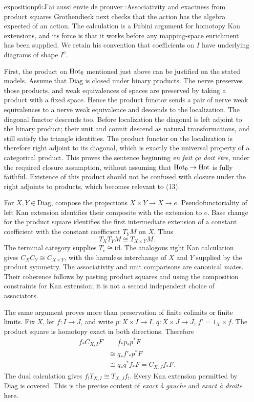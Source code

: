 \begin{dcomment}{exposition}{p6:J’ai aussi envie de prouver :}{Associativity and exactness from product squares}
Grothendieck next checks that the action has the algebra expected of an action. The calculation is a Fubini argument for homotopy Kan extensions, and its force is that it works before any mapping-space enrichment has been supplied. We retain his convention that coefficients on \(I\) have underlying diagrams of shape \(I^o\).

First, the product on \(\mathrm{Hot}_0\) mentioned just above can be justified on the stated models. Assume that \(\mathrm{Diag}\) is closed under binary products. The nerve preserves those products, and weak equivalences of spaces are preserved by taking a product with a fixed space. Hence the product functor sends a pair of nerve weak equivalences to a nerve weak equivalence and descends to the localization. The diagonal functor descends too. Before localization the diagonal is left adjoint to the binary product; their unit and counit descend as natural transformations, and still satisfy the triangle identities. The product functor on the localization is therefore right adjoint to its diagonal, which is exactly the universal property of a categorical product. This proves the sentence beginning \emph{en fait ça doit être}, under the required closure assumption, without assuming that \(\mathrm{Hot}_0\to\mathrm{Hot}\) is fully faithful. Existence of this product should not be confused with closure under the right adjoints to products, which becomes relevant to (13).

For \(X,Y\in\mathrm{Diag}\), compose the projections \(X\times Y\to X\to e\). Pseudofunctoriality of left Kan extension identifies their composite with the extension to \(e\). Base change for the product square identifies the first intermediate extension of a constant coefficient with the constant coefficient \(T_YM\) on \(X\). Thus
\[
 T_XT_YM\cong T_{X\times Y}M.
\]
The terminal category supplies \(T_e\cong\mathrm{id}\). The analogous right Kan calculation gives \(C_XC_Y\cong C_{X\times Y}\), with the harmless interchange of \(X\) and \(Y\) supplied by the product symmetry. The associativity and unit comparisons are canonical mates. Their coherence follows by pasting product squares and using the composition constraints for Kan extension; it is not a second independent choice of associators.

The same argument proves more than preservation of finite colimits or finite limits. Fix \(X\), let \(f:I\to J\), and write \(p:X\times I\to I\), \(q:X\times J\to J\), \(f'=1_X\times f\). The product square is homotopy exact in both directions. Therefore
\[
\begin{aligned}
 f_*C_{X,I}F
 &=f_*p_*p^*F\\
 &\cong q_*f'_*p^*F\\
 &\cong q_*q^*f_*F=C_{X,J}f_*F .
\end{aligned}
\]
The dual calculation gives \(f_!T_{X,I}\cong T_{X,J}f_!\). Every Kan extension permitted by \(\mathrm{Diag}\) is covered. This is the precise content of \emph{exact à gauche} and \emph{exact à droite} here.


\end{dcomment}
